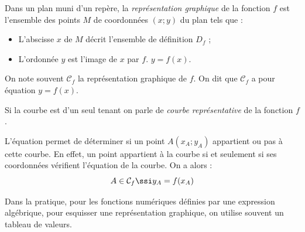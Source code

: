 \begin{definition}
Dans un plan muni d'un rep\`ere, la \emph{repr\'esentation graphique} de la fonction $f$ est l'ensemble des points $M$ de coordonn\'ees $(x;y)$ du plan tels que :
\begin{itemize}
	\item L'abscisse $x$ de $M$ d\'ecrit l'ensemble de d\'efinition $D_f$ ;
	\item L'ordonn\'ee $y$ est l'image de $x$ par $f$. $y=f(x)$.
\end{itemize}

On note souvent $\mathcal{C}_f$ la repr\'esentation graphique de $f$. On dit que $\mathcal{C}_f$ a pour \'equation $y=f(x)$.

Si la courbe est d'un seul \og{} tenant \fg{} on parle  de \emph{courbe repr\'esentative} de la fonction $f$.
\end{definition}


\begin{rmq} L'\'equation permet de d\'eterminer si un point $A(x_A;y_A)$ appartient ou pas \`a cette courbe. En effet, un point appartient \`a la courbe si et seulement si ses coordonn\'ees v\'erifient l'\'equation de la courbe. On a alors : \[A\in\mathcal{C}_f\ssi y_A=f(x_A)\] \end{rmq}


Dans la pratique, pour les fonctions num\'eriques d\'efinies par une expression alg\'ebrique, pour esquisser une repr\'esentation graphique, on utilise souvent un tableau de valeurs.

